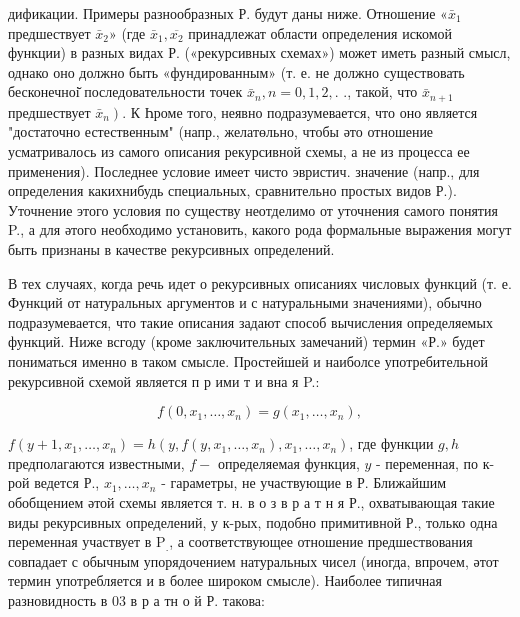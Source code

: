 \documentclass[10pt]{article}
\begin{document}
дификации. Примеры разнообразных Р. будут даны ниже. Отношение $« \bar{x}_{1}$ предшествует $\bar{x}_{2} »$ (где $\bar{x}_{1}, \overline{x_{2}}$ принадлежат области определения искомой функции) в разных видах Р. («рекурсивных схемах») может иметь разный смысл, однако оно должно быть «фундированным» (т. е. не должно существовать бесконечноі̆ последовательности точек $\bar{x}_{n}, n=0,1,2,$. ., такой, что $\bar{x}_{n+1}$ предшествует $\left.\bar{x}_{n}\right)$. К Һроме того, неявно подразумевается, что оно является "достаточно естественным" (напр., желатөльно, чтобы әто отношение усматривалось из самого описания рекурсивной схемы, а не из процесса ее применения). Последнее условие имеет чисто эвристич. значение (напр., для определения какихнибудь специальных, сравнительно простых видов Р.). Уточнение этого условия по существу неотделимо от уточнения самого понятия P., а для әтого необходимо установить, какого рода формальные выражения могут быть признаны в качестве рекурсивных определений.



В тех случаях, когда речь идет о рекурсивных описаниях числовых функций (т. е. Функций от натуральных аргументов и с натуральными значениями), обычно подразумевается, что такие описания задают способ вычисления определяемых функций. Ниже всгоду (кроме заключительных замечаний) термин «Р.» будет пониматься именно в таком смысле. Простейшей и наиболсе употребительной рекурсивной схемой является п р ими т и вна я P.:



\[

f\left(0, x_{1}, \ldots, x_{n}\right)=g\left(x_{1}, \ldots, x_{n}\right),

\]



$f\left(y+1, x_{1}, \ldots, x_{n}\right)=h\left(y, f\left(y, x_{1}, \ldots, x_{n}\right), x_{1}, \ldots, x_{n}\right)$, где функции $g, h$ предполагаются известными, $f-$ определяемая функция, $y$ - переменная, по к-рой ведется Р., $x_{1}, \ldots, x_{n}$ - гараметры, не участвующие в Р. Ближайшим обобщением әтой схемы является т. н. в о з в р а т н я Р., охватывающая такие виды рекурсивных определений, у к-рых, подобно примитивной Р., только одна переменная участвует в $\mathrm{P}_{.}$, а соответствующее отношение предшествования совпадает с обычным упорядочением натуральных чисел (иногда, впрочем, әтот термин употребляется и в более широком смысле). Наиболее типичная разновидность в 03 в р а тн о й Р. такова:
\end{document}
